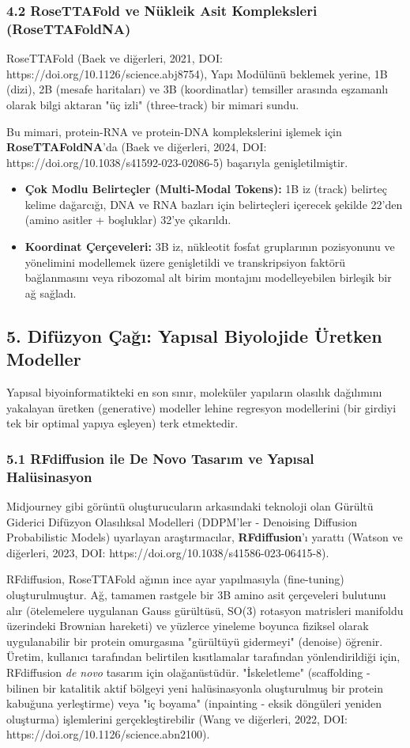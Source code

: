 \documentclass[11pt,a4paper]{article}
\begin{document}
\subsubsection{4.2 RoseTTAFold ve Nükleik Asit Kompleksleri (RoseTTAFoldNA)}
RoseTTAFold (Baek ve diğerleri, 2021, DOI: https://doi.org/10.1126/science.abj8754), Yapı Modülünü beklemek yerine, 1B (dizi), 2B (mesafe haritaları) ve 3B (koordinatlar) temsiller arasında eşzamanlı olarak bilgi aktaran "üç izli" (three-track) bir mimari sundu.

Bu mimari, protein-RNA ve protein-DNA komplekslerini işlemek için \textbf{RoseTTAFoldNA}'da (Baek ve diğerleri, 2024, DOI: https://doi.org/10.1038/s41592-023-02086-5) başarıyla genişletilmiştir.

\begin{itemize}
  \item \textbf{Çok Modlu Belirteçler (Multi-Modal Tokens):} 1B iz (track) belirteç kelime dağarcığı, DNA ve RNA bazları için belirteçleri içerecek şekilde 22'den (amino asitler + boşluklar) 32'ye çıkarıldı.
  \item \textbf{Koordinat Çerçeveleri:} 3B iz, nükleotit fosfat gruplarının pozisyonunu ve yönelimini modellemek üzere genişletildi ve transkripsiyon faktörü bağlanmasını veya ribozomal alt birim montajını modelleyebilen birleşik bir ağ sağladı.
\end{itemize}
\subsection{5. Difüzyon Çağı: Yapısal Biyolojide Üretken Modeller}
Yapısal biyoinformatikteki en son sınır, moleküler yapıların olasılık dağılımını yakalayan üretken (generative) modeller lehine regresyon modellerini (bir girdiyi tek bir optimal yapıya eşleyen) terk etmektedir.

\subsubsection{5.1 RFdiffusion ile De Novo Tasarım ve Yapısal Halüsinasyon}
Midjourney gibi görüntü oluşturucuların arkasındaki teknoloji olan Gürültü Giderici Difüzyon Olasılıksal Modelleri (DDPM'ler - Denoising Diffusion Probabilistic Models) uyarlayan araştırmacılar, \textbf{RFdiffusion}'ı yarattı (Watson ve diğerleri, 2023, DOI: https://doi.org/10.1038/s41586-023-06415-8).

RFdiffusion, RoseTTAFold ağının ince ayar yapılmasıyla (fine-tuning) oluşturulmuştur. Ağ, tamamen rastgele bir 3B amino asit çerçeveleri bulutunu alır (ötelemelere uygulanan Gauss gürültüsü, SO(3) rotasyon matrisleri manifoldu üzerindeki Brownian hareketi) ve yüzlerce yineleme boyunca fiziksel olarak uygulanabilir bir protein omurgasına "gürültüyü gidermeyi" (denoise) öğrenir. Üretim, kullanıcı tarafından belirtilen kısıtlamalar tarafından yönlendirildiği için, RFdiffusion \textit{de novo} tasarım için olağanüstüdür. "İskeletleme" (scaffolding - bilinen bir katalitik aktif bölgeyi yeni halüsinasyonla oluşturulmuş bir protein kabuğuna yerleştirme) veya "iç boyama" (inpainting - eksik döngüleri yeniden oluşturma) işlemlerini gerçekleştirebilir (Wang ve diğerleri, 2022, DOI: https://doi.org/10.1126/science.abn2100).
\end{document}
